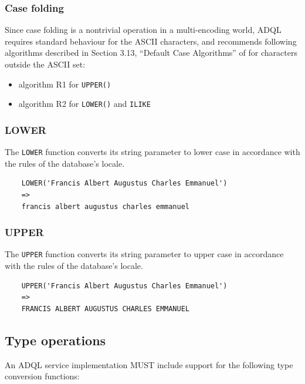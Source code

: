 \documentclass[11pt,a4paper]{ivoa}
\begin{document}
\subsubsection{Case folding}

Since case folding is a nontrivial operation in a multi-encoding world, ADQL
requires standard behaviour for the ASCII characters, and recommends
following algorithms described in Section 3.13, ``Default Case Algorithms''
of \citet{std:UNICODE} for characters outside the ASCII set:

\begin{itemize}
    \item algorithm R1 for \verb:UPPER():
    \item algorithm R2 for \verb:LOWER(): and \verb:ILIKE: 
\end{itemize}

\subsubsection{LOWER}
\label{sec:string.functions.lower}

The \texttt{LOWER} function converts its string parameter to lower case in
accordance with the rules of the database's locale.

\begin{verbatim}
    LOWER('Francis Albert Augustus Charles Emmanuel')
    =>
    francis albert augustus charles emmanuel
\end{verbatim}

\subsubsection{UPPER}
\label{sec:string.functions.upper}

The \texttt{UPPER} function converts its string parameter to upper case in
accordance with the rules of the database's locale.

\begin{verbatim}
    UPPER('Francis Albert Augustus Charles Emmanuel')
    =>
    FRANCIS ALBERT AUGUSTUS CHARLES EMMANUEL
\end{verbatim}

\subsection{Type operations}
\label{sec:type}

An ADQL service implementation MUST include support for the following
type conversion functions:
\end{document}
